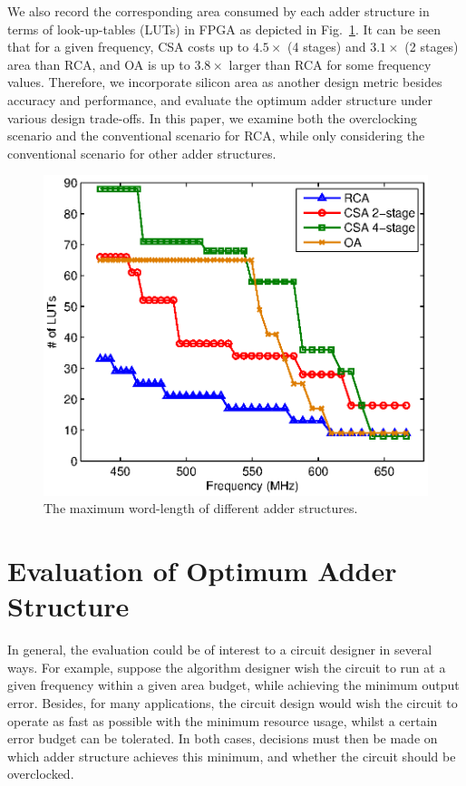 \documentclass[10pt, conference, compsocconf]{IEEEtran}
\begin{document}
We also record the corresponding area consumed by each adder structure in terms of look-up-tables (LUTs) in FPGA as depicted in Fig.~\ref{Fig:area_adder}. It can be seen that for a given frequency, CSA costs up to $4.5\times$ (4 stages) and $3.1\times$ (2 stages) area than RCA, and OA is up to $3.8\times$ larger than RCA for some frequency values. Therefore, we incorporate silicon area as another design metric besides accuracy and performance, and evaluate the optimum adder structure under various design trade-offs. In this paper, we examine both the overclocking scenario and the conventional scenario for RCA, while only considering the conventional scenario for other adder structures.
%
\begin{figure}[tbp]
  \centering
  \includegraphics[width=.5\textwidth]{./figures/exp/area_adders.eps}
  \caption{The maximum word-length of different adder structures.}
  \label{Fig:area_adder}
\end{figure}



\section{Evaluation of Optimum Adder Structure}\label{sec:optimum_adder}
In general, the evaluation could be of interest to a circuit designer in several ways. For example, suppose the algorithm designer wish the circuit to run at a given frequency within a given area budget, while achieving the minimum output error. Besides, for many applications, the circuit design would wish the circuit to operate as fast as possible with the minimum resource usage, whilst a certain error budget can be tolerated. In both cases, decisions must then be made on which adder structure achieves this minimum, and whether the circuit should be overclocked. 
\end{document}
